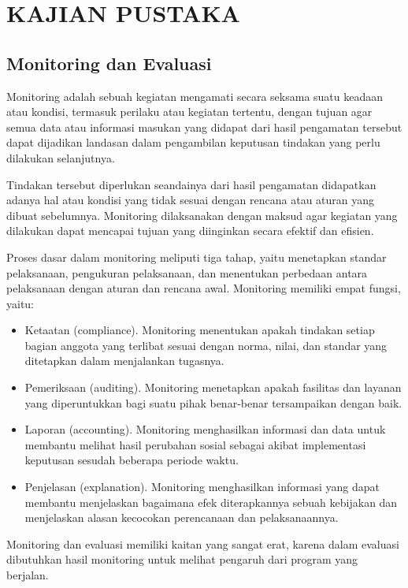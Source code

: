 
\chapter{KAJIAN PUSTAKA}                
	
\section{Monitoring dan Evaluasi}

	Monitoring adalah sebuah kegiatan mengamati secara seksama suatu keadaan atau kondisi, termasuk perilaku atau kegiatan tertentu, dengan tujuan agar semua data atau informasi masukan yang didapat dari hasil pengamatan tersebut dapat dijadikan landasan dalam pengambilan keputusan tindakan yang perlu dilakukan selanjutnya. 

	Tindakan tersebut diperlukan seandainya dari hasil pengamatan didapatkan adanya hal atau kondisi yang tidak sesuai dengan rencana atau aturan yang dibuat sebelumnya. Monitoring dilaksanakan dengan maksud agar kegiatan yang dilakukan dapat mencapai tujuan yang diinginkan secara efektif dan efisien.

	Proses dasar dalam monitoring meliputi tiga tahap, yaitu menetapkan standar pelaksanaan, pengukuran pelaksanaan, dan menentukan perbedaan antara pelaksanaan dengan aturan dan rencana awal. Monitoring memiliki empat fungsi, yaitu: \citep{Dunn2014}
\begin{itemize}
	\item Ketaatan (compliance). Monitoring menentukan apakah tindakan setiap bagian anggota yang terlibat sesuai dengan norma, nilai, dan standar yang ditetapkan dalam menjalankan tugasnya.
	\item Pemeriksaan (auditing). Monitoring menetapkan apakah fasilitas dan layanan yang diperuntukkan bagi suatu pihak benar-benar tersampaikan dengan baik.
	\item Laporan (accounting). Monitoring menghasilkan informasi dan data untuk membantu melihat hasil perubahan sosial sebagai akibat implementasi keputusan sesudah beberapa periode waktu.
	\item Penjelasan (explanation). Monitoring menghasilkan informasi yang dapat membantu menjelaskan bagaimana efek diterapkannya sebuah kebijakan dan menjelaskan alasan kecocokan perencanaan dan pelaksanaannya.
\end{itemize}
	Monitoring dan evaluasi memiliki kaitan yang sangat erat, karena dalam evaluasi dibutuhkan hasil monitoring untuk melihat pengaruh dari program yang berjalan.

